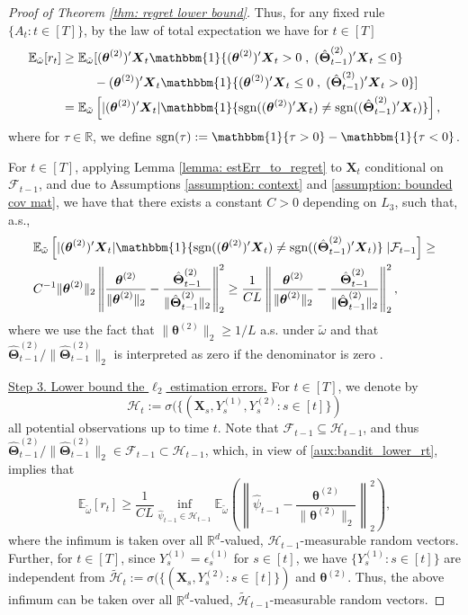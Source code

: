 \documentclass[aos,preprint]{imsart}
\theoremstyle{plain}
\theoremstyle{definition}
\newcommand{\btheta}{\boldsymbol{\theta}}
\newcommand{\idf}{\mathbbm{1}}
\newcommand{\bX}{\boldsymbol{X}}
\newcommand{\hbTheta}{\hat{\boldsymbol{\Theta}}}
\newcommand{\bR}{\mathbb{R}}
\newcommand{\cF}{\mathcal{F}}
\newcommand{\Exp}{\mathbb{E}}
\begin{document}
\begin{appendix}
\begin{proof}[Proof of Theorem \ref{thm: regret lower bound}]
Thus, for any fixed rule $\{A_t: t \in [T]\}$, by the law of total expectation we have for $t \in [T]$
\begin{align}\label{aux:bandit_lower_rt}
\begin{split}
\Exp_{\tilde{\omega}}[r_t] &\geq   \Exp_{\tilde{\omega}}[(\btheta^{(2)})'\bX_t\idf\{(\btheta^{(2)})'\bX_t > 0\;,\;(\hbTheta_{t-1}^{(2)})'\bX_t\le 0\}
\\&\;\;\qquad -(\btheta^{(2)})'\bX_t\idf\{(\btheta^{(2)})'\bX_t \leq 0\;,\;(\hbTheta_{t-1}^{(2)})'\bX_t > 0\}]
\\&=\Exp_{\tilde{\omega}}\left[|(\btheta^{(2)})'\bX_t|\idf\{\textup{sgn}((\btheta^{(2)})'\bX_t)\neq\textup{sgn}((\hbTheta_{t-1}^{(2)})'\bX_t)\}\right],
\end{split}
 \end{align}
where for $\tau \in \bR$, we define $\text{sgn}(\tau) := \idf\{\tau > 0\} - \idf\{\tau < 0\}$.

For $t \in [T]$, applying Lemma \ref{lemma: estErr_to_regret} to $\bX_t$ conditional on $\cF_{t-1}$, and due to Assumptions \ref{assumption: context} and  \ref{assumption: bounded cov mat}, we have that there exists a constant $C>0$ depending on $L_3$, such that, a.s.,
\begin{align*}
&\Exp_{\tilde{\omega}}\left[|(\btheta^{(2)})'\bX_t|\idf\{\textup{sgn}((\btheta^{(2)})'\bX_t)\neq\textup{sgn}((\hbTheta_{t-1}^{(2)})'\bX_t)\} \; \vert \cF_{t-1} \right] \ge \\
&C^{-1}\|\btheta^{(2)}\|_2\left\|\frac{\btheta^{(2)}}{\|\btheta^{(2)}\|_2}- \frac{\hbTheta_{t-1}^{(2)}}{\|\hbTheta_{t-1}^{(2)}\|_2}\right\|_2^2 \ge \frac{1}{C L}\left\|\frac{\btheta^{(2)}}{\|\btheta^{(2)}\|_2}- \frac{\hbTheta_{t-1}^{(2)}}{\|\hbTheta_{t-1}^{(2)}\|_2}\right\|_2^2,
\end{align*}
where we use  the fact that $\|\btheta^{(2)}\|_2 \geq 1/L$ a.s. under $\tilde{\omega}$ and that $\hbTheta_{t-1}^{(2)}/\|\hbTheta_{t-1}^{(2)}\|_2$ is interpreted as zero if the denominator is zero .


\medskip
\noindent \underline{Step 3. Lower bound the $\ell_2$ estimation errors.} 
For $t \in [T]$, we denote by 
$$
\mathcal{H}_t := \sigma(\{(\bX_s, Y_s^{(1)}, Y_s^{(2)}: s \in [t]\})
$$ 
all potential observations up to time $t$. Note that $\cF_{t-1} \subseteq {\mathcal{H}}_{t-1}$, and thus
 $\hbTheta_{t-1}^{(2)}/\|\hbTheta_{t-1}^{(2)}\|_2 \in \cF_{t-1} \subset {\mathcal{H}}_{t-1}$, which, in view of \eqref{aux:bandit_lower_rt}, implies that 
$$
\Exp_{\tilde{\omega}}\left[r_t \right] \ge \frac{1}{CL} \inf_{\hat{\psi}_{t-1} \in  {\mathcal{H}}_{t-1}} \Exp_{\tilde{\omega}}\left(\left\|\hat{\psi}_{t-1}-\frac{\btheta^{(2)}}{\|\btheta^{(2)}\|_2} \right\|_2^2 \right),
$$
where the infimum is taken over all $\mathbb{R}^d$-valued, $\mathcal{H}_{t-1}$-measurable random vectors.
Further, for $t \in [T]$,   since $Y_s^{(1)} = \epsilon_s^{(1)}$ for $s \in [t]$, we have $\{Y_s^{(1)}:  s \in [t]\}$ are independent from $\tilde{\mathcal{H}}_t := \sigma(\{(\bX_s,   Y_s^{(2)}:  s \in [t]\})$ and $\btheta^{(2)}$. Thus, the above infimum can be taken 
over all $\mathbb{R}^d$-valued, \emph{$\tilde{\mathcal{H}}_{t-1}$}-measurable random vectors.


\end{proof}
\end{appendix}
\end{document}
